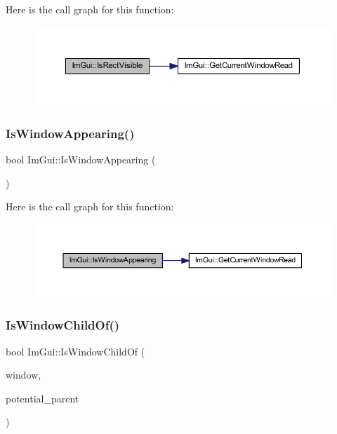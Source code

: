 Here is the call graph for this function\+:
\nopagebreak
\begin{figure}[H]
\begin{center}
\leavevmode
\includegraphics[width=350pt]{namespace_im_gui_a5aca7e6939e07caaca489aa8c776fd81_cgraph}
\end{center}
\end{figure}
\mbox{\label{namespace_im_gui_a99fd14154aae264087d471132e56a42e}} 
\subsubsection{\texorpdfstring{Is\+Window\+Appearing()}{IsWindowAppearing()}}
{\footnotesize\ttfamily bool Im\+Gui\+::\+Is\+Window\+Appearing (\begin{DoxyParamCaption}{ }\end{DoxyParamCaption})}

Here is the call graph for this function\+:
\nopagebreak
\begin{figure}[H]
\begin{center}
\leavevmode
\includegraphics[width=350pt]{namespace_im_gui_a99fd14154aae264087d471132e56a42e_cgraph}
\end{center}
\end{figure}
\mbox{\label{namespace_im_gui_a2ca7721bfc85f5e98c212c2e9ad793b5}} 
\subsubsection{\texorpdfstring{Is\+Window\+Child\+Of()}{IsWindowChildOf()}}
{\footnotesize\ttfamily bool Im\+Gui\+::\+Is\+Window\+Child\+Of (\begin{DoxyParamCaption}\item[{\mbox{\hyperlink{struct_im_gui_window}{Im\+Gui\+Window}} $\ast$}]{window,  }\item[{\mbox{\hyperlink{struct_im_gui_window}{Im\+Gui\+Window}} $\ast$}]{potential\+\_\+parent }\end{DoxyParamCaption})}

